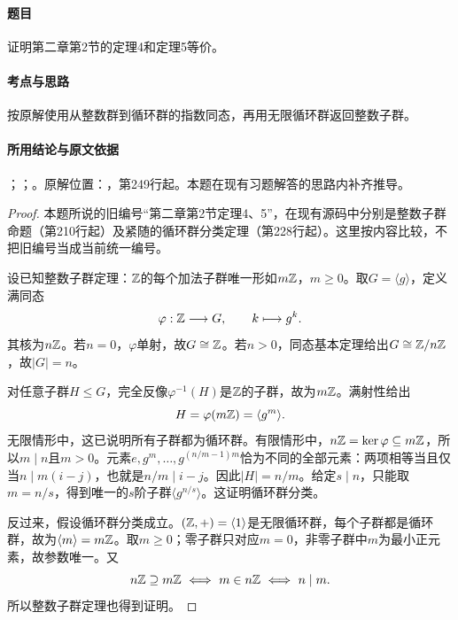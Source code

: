 \label{ex:3:24}

\paragraph{题目}

证明第二章第2节的定理4和定理5等价。

\paragraph{考点与思路}

按原解使用从整数群到循环群的指数同态，再用无限循环群返回整数子群。

\paragraph{所用结论与原文依据}

；；。原解位置：，第249行起。本题在现有习题解答的思路内补齐推导。


\begin{proof}

本题所说的旧编号“第二章第2节定理4、5”，在现有源码中分别是整数子群命题（第210行起）及紧随的循环群分类定理（第228行起）。这里按内容比较，不把旧编号当成当前统一编号。

设已知整数子群定理：$\mathbb Z$的每个加法子群唯一形如$m\mathbb Z$，$m\ge0$。取$G=\langle g\rangle$，定义满同态
\[
\varphi:\mathbb Z\longrightarrow G,\qquad k\longmapsto g^k.
\]
其核为$n\mathbb Z$。若$n=0$，$\varphi$单射，故$G\cong\mathbb Z$。若$n>0$，同态基本定理给出$G\cong\mathbb Z/n\mathbb Z$，故$|G|=n$。

对任意子群$H\le G$，完全反像$\varphi^{-1}(H)$是$\mathbb Z$的子群，故为$m\mathbb Z$。满射性给出
\[
H=\varphi(m\mathbb Z)=\langle g^m\rangle.
\]
无限情形中，这已说明所有子群都为循环群。有限情形中，$n\mathbb Z=\ker\varphi\subseteq m\mathbb Z$，所以$m\mid n$且$m>0$。元素$e,g^m,\ldots,g^{(n/m-1)m}$恰为不同的全部元素：两项相等当且仅当$n\mid m(i-j)$，也就是$n/m\mid i-j$。因此$|H|=n/m$。给定$s\mid n$，只能取$m=n/s$，得到唯一的$s$阶子群$\langle g^{n/s}\rangle$。这证明循环群分类。

反过来，假设循环群分类成立。$(\mathbb Z,+)=\langle1\rangle$是无限循环群，每个子群都是循环群，故为$\langle m\rangle=m\mathbb Z$。取$m\ge0$；零子群只对应$m=0$，非零子群中$m$为最小正元素，故参数唯一。又
\[
n\mathbb Z\supseteq m\mathbb Z\ \Longleftrightarrow\ m\in n\mathbb Z
\ \Longleftrightarrow\ n\mid m.
\]
所以整数子群定理也得到证明。

\end{proof}


